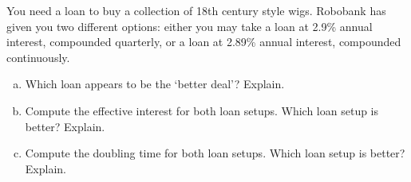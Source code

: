 \documentclass[11pt,letterpaper]{article}
\begin{document}

 You need a loan to buy a collection of 18th century style wigs. Robobank has given you two different options: either you may take a loan at 2.9\% annual interest, compounded quarterly, or a loan at 2.89\% annual interest, compounded continuously. 
	\begin{enumerate}[(a)]
	\item Which loan appears to be the `better deal'? Explain. 
	\item Compute the effective interest for both loan setups. Which loan setup is better? Explain. 
	\item Compute the doubling time for both loan setups. Which loan setup is better? Explain.
	\end{enumerate} \pspace
\end{document}
